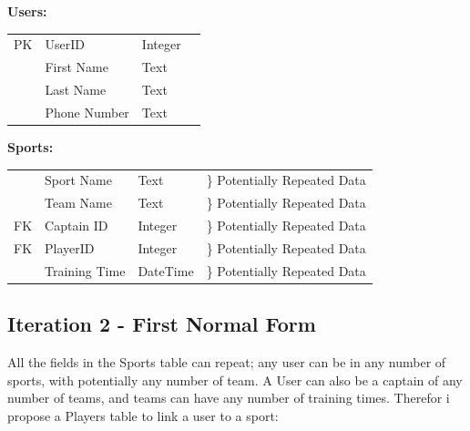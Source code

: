 \documentclass[10pt]{article}
\begin{document}
                \begin{center}
                    \textbf{Users:}\\
                    \begin{tabular}{ | r | l | l | p{10cm} } 
                        \cline{1-3}
                        PK & UserID & Integer & \\ \cline{1-3}
                        & First Name & Text & \\ \cline{1-3}
                        & Last Name & Text & \\ \cline{1-3}
                        & Phone Number & Text & \\ \cline{1-3}
                    \end{tabular}
                \end{center}

                \begin{center}
                    \textbf{Sports:}\\
                    \begin{tabular}{ | r | l | l | p{10cm} } 
                        \cline{1-3}
                        & Sport Name & Text & \} Potentially Repeated Data \\ \cline{1-3}
                        & Team Name & Text & \} Potentially Repeated Data \\ \cline{1-3}
                        FK & Captain ID & Integer & \} Potentially Repeated Data \\ \cline{1-3}
                        FK & PlayerID & Integer & \} Potentially Repeated Data \\ \cline{1-3}
                        & Training Time & DateTime & \} Potentially Repeated Data \\ \cline{1-3}
                    \end{tabular}
                \end{center}

            \subsection{Iteration 2 - First Normal Form}

                All the fields in the Sports table can repeat; any user can be in any number of sports, with potentially any number of team. A User can also be a captain of any number of teams, and teams can have any number of training times. Therefor i propose a Players table to link a user to a sport:
\end{document}
